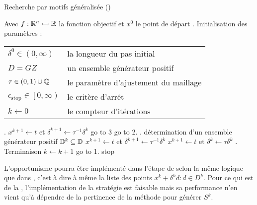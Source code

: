 \begin{algorithm}[H]
	\caption{\textsf{Recherche par motifs généralisée} (\GPS)}
	\label{alg:gps}
	\begin{algorithmic}
		\STATE Avec $f:\mathbb{R}^n \rightarrowtail \mathbb{R}$ la fonction objectif et $x^0$ le point de départ
		. \textsf{Initialisation des paramètres} : 
		\bindent
		\STATE\begin{flushleft}
			\begin{tabular}{l l}
				$\delta^0 \in (0,\infty)$ & la longueur du pas initial\\
				$D=GZ$ & un ensemble générateur positif\\
				$\tau \in (0,1) \cup \mathbb{Q}$ & le paramètre d'ajustement du maillage\\
				$\epsilon_{\text{stop}} \in \left[ 0,\infty \right) $ & le critère d'arrêt\\
				$k \leftarrow 0$ & le compteur d'itérations\\
			\end{tabular}
		\end{flushleft}
		\eindent
		. \SEARCH
		\bindent
		\STATE $x^{k+1} \leftarrow t$ et $\delta^{k+1} \leftarrow \tau ^{-1}\delta^k$
		\STATE go to 3
		\ELSE
		\STATE go to 2.
		\ENDIF
		\eindent
		. \POLL
		\bindent
		\STATE détermination d'un ensemble générateur positif $\mathbb{D}^k \subseteq \mathbb{D}$
		\STATE $x^{k+1} \leftarrow t$ et $\delta^{k+1} \leftarrow \tau ^{-1}\delta^k$
		\ELSE
		\STATE $x^{k+1} \leftarrow t$ et $\delta^{k} \leftarrow \tau\delta^k$
		\ENDIF
		\eindent
		. \textsf{Terminaison}
		\bindent
		\STATE $k\leftarrow k+1$
		\STATE go to 1.
		\ELSE
		\STATE stop
		\ENDIF
		\eindent
	\end{algorithmic}
\end{algorithm}
L'opportunisme pourra être implémenté dans l'étape de \POLL{} selon la même logique que dans \CS, c'est à dire à même la liste des points $x^k + \delta^k d : d \in D^k$. Pour ce qui est de la \SEARCH, l'implémentation de la stratégie est faisable mais sa performance n'en vient qu'à dépendre de la pertinence de la méthode pour générer $S^k$.
